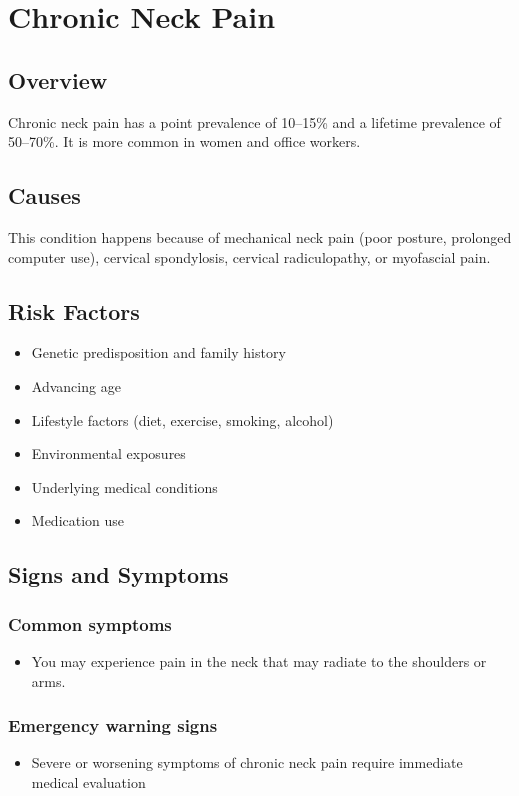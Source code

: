 \chapter{Chronic Neck Pain}
\label{sec:Chronic Neck Pain}

\section{Overview}
Chronic neck pain has a point prevalence of 10--15\% and a lifetime prevalence of 50--70\%. It is more common in women and office workers.
\section{Causes}
This condition happens because of mechanical neck pain (poor posture, prolonged computer use), cervical spondylosis, cervical radiculopathy, or myofascial pain.     
\section{Risk Factors}

\begin{itemize}[noitemsep]
  \item Genetic predisposition and family history
  \item Advancing age
  \item Lifestyle factors (diet, exercise, smoking, alcohol)
  \item Environmental exposures
  \item Underlying medical conditions
  \item Medication use
\end{itemize}
\section{Signs and Symptoms}

\subsection{Common symptoms}
\begin{itemize}[noitemsep]
  \item You may experience pain in the neck that may radiate to the shoulders or arms. 
  \end{itemize}

\subsection{Emergency warning signs}
\begin{itemize}[noitemsep]
  \item Severe or worsening symptoms of chronic neck pain require immediate medical evaluation
\end{itemize}
